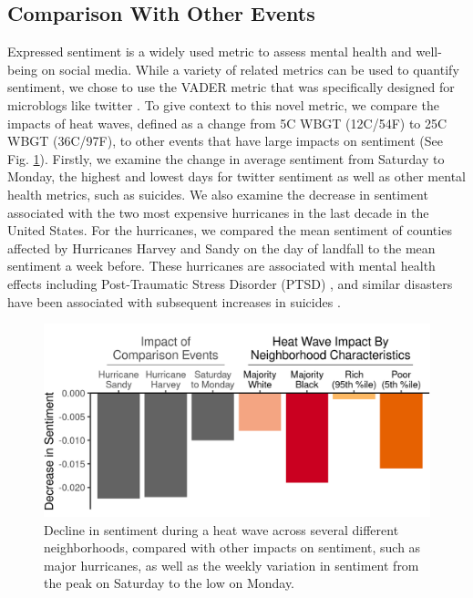 \documentclass{article}
\begin{document}
\subsection{Comparison With Other Events}

Expressed sentiment is a widely used metric to assess mental health and well-being on social media.  While a variety of related metrics can be used to quantify sentiment, we chose to use the VADER metric that was specifically designed for microblogs like twitter \cite{hutto2014vader}.  To give context to this novel metric, we compare the impacts of heat waves, defined as a change from 5\textdegree C WBGT (12\textdegree C/54\textdegree F) to 25\textdegree C WBGT (36\textdegree C/97\textdegree F), to other events that have large impacts on sentiment (See Fig. \ref{fig:compare}).  Firstly, we examine the change in average sentiment from Saturday to Monday, the highest and lowest days for twitter sentiment as well as other mental health metrics, such as suicides.  We also examine the decrease in sentiment associated with the two most expensive hurricanes in the last decade in the United States.  For the hurricanes, we compared the mean sentiment of counties affected by Hurricanes Harvey and Sandy on the day of landfall to the mean sentiment a week before.  These hurricanes are associated with mental health effects including Post-Traumatic Stress Disorder (PTSD) \cite{Schwartz2017Aug, Schwartz2018May}, and similar disasters have been associated with subsequent increases in suicides \cite{Krug1998Feb}.

\begin{figure}[H]
  \centering
  \includegraphics[width=\linewidth]{../res/comparison_plot.png}
  \caption{Decline in sentiment during a heat wave across several different neighborhoods, compared with other impacts on sentiment, such as major hurricanes, as well as the weekly variation in sentiment from the peak on Saturday to the low on Monday.}
  \label{fig:compare}
\end{figure}
\end{document}
